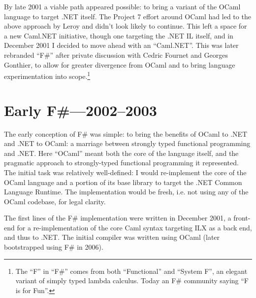 \documentclass[acmsmall]{acmart}\settopmatter{}
\begin{document}
By late 2001 a viable path appeared possible: to bring a variant of the OCaml language to target .NET itself. The Project 7 effort around OCaml
had led to the above approach by Leroy and didn’t look likely to continue.  This left a space for a new Caml.NET initiative, though one targeting
the .NET IL itself, and in December 2001 I decided to move ahead with an “Caml.NET”. This was later rebranded “F\#” after private discussion with
Cedric Fournet and Georges Gonthier, to allow for greater divergence from OCaml and to bring language experimentation into
scope.\footnote{The “F” in “F\#” comes from both “Functional” and “System F”, an elegant variant of simply typed lambda calculus. Today an F\# community saying “F is for Fun”.}


\section*{Early F\#---2002--2003}

The early conception of F\# was simple: to bring the benefits of OCaml to .NET and .NET to OCaml: a marriage between strongly typed functional
programming and .NET.  Here “OCaml” meant both the core of the language itself, and the pragmatic approach to strongly-typed functional programming
it represented. The initial task was relatively well-defined: I would re-implement the core of the OCaml language and a portion of its base
library to target the .NET Common Language Runtime. The implementation would be fresh, i.e. not using any of the OCaml codebase, for legal clarity. 

The first lines of the F\# implementation were written in December 2001, a front-end for a re-implementation of the core Caml syntax targeting ILX as a back end, and thus to .NET. The initial compiler was written using OCaml (later bootstrapped using F\# in 2006). 
\end{document}

